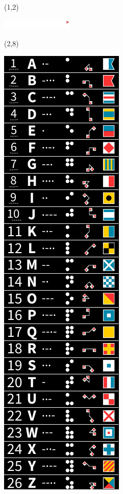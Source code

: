 \documentclass{extarticle}
\begin{document}
\pagecolor{black}
\pagestyle{empty}


\begin{textblock}{42}(1,2)
\vfill
{\centerline{\includegraphics[height=5mm]{tools/images/logo-navic.pdf}}} 
\vfill
\end{textblock}

\begin{textblock}{38}(2,8)
\vfill
{\centerline{\includegraphics[scale=1,]{tools/main.pdf}}} 
\vfill
\end{textblock}
\end{document}
